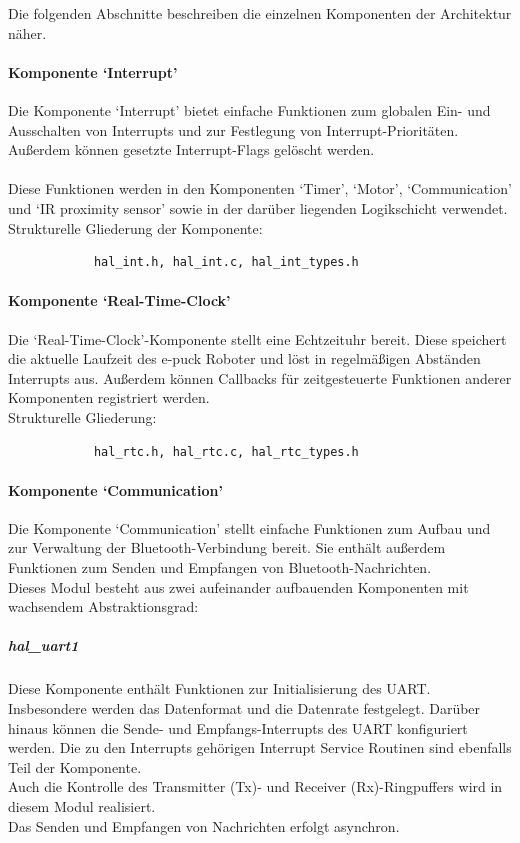 \documentclass[10pt,a4paper]{article}
\begin{document}
		Die folgenden Abschnitte beschreiben die einzelnen Komponenten der Architektur näher.
		 
			\paragraph*{Komponente `Interrupt'}
			Die Komponente `Interrupt' bietet einfache Funktionen zum globalen Ein- und Ausschalten von Interrupts und zur Festlegung
			von Interrupt-Prioritäten. Außerdem können gesetzte Interrupt-Flags gelöscht werden. \\ \\
			Diese Funktionen werden in den Komponenten `Timer', `Motor', `Communication' und `IR proximity sensor' sowie
			in der darüber liegenden Logikschicht verwendet. \\
			
			Strukturelle Gliederung der Komponente:
			\begin{verbatim}  
			hal_int.h, hal_int.c, hal_int_types.h
			\end{verbatim}

			\paragraph*{Komponente `Real-Time-Clock'}
			Die `Real-Time-Clock'-Komponente stellt eine Echtzeituhr bereit. Diese speichert die aktuelle Laufzeit des e-puck Roboter und löst in
			regelmäßigen Abständen Interrupts aus.
			Außerdem können Callbacks für zeitgesteuerte Funktionen anderer Komponenten registriert werden. \\
			
			Strukturelle Gliederung:
			\begin{verbatim}  
			hal_rtc.h, hal_rtc.c, hal_rtc_types.h
			\end{verbatim}
			
			\paragraph*{Komponente `Communication'}
			Die Komponente `Communication' stellt einfache Funktionen zum Aufbau und zur Verwaltung  der Bluetooth-Verbindung bereit.
			Sie enthält außerdem Funktionen zum Senden und Empfangen von Bluetooth-Nachrichten.\\
			 
			Dieses Modul besteht aus zwei aufeinander aufbauenden Komponenten mit wachsendem Abstraktionsgrad:
			
				\subparagraph*{hal\_uart1}
				Diese Komponente enthält Funktionen zur Initialisierung des UART. Insbesondere werden das Datenformat und die Datenrate festgelegt.
				Darüber hinaus können die Sende- und Empfangs-Interrupts des UART konfiguriert werden. Die zu den Interrupts gehörigen Interrupt
				Service Routinen sind ebenfalls Teil der Komponente. \\
				Auch die Kontrolle des Transmitter (Tx)- und Receiver (Rx)-Ringpuffers wird in diesem Modul realisiert. \\
				Das Senden und Empfangen von Nachrichten erfolgt asynchron. \\
				
\end{document}
